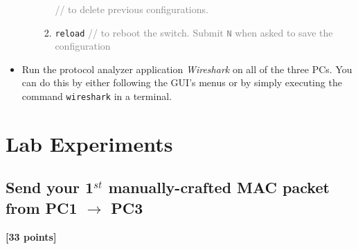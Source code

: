 \documentclass[pdftex,12pt,a4paper]{article}
\begin{document}
\begin{itemize}
\begin{enumerate}
\begin{enumerate}
                            \textcolor{gray}{// to delete previous
                            configurations.}
                            \item \texttt{reload} \textcolor{gray}{// to reboot
                            the switch. Submit \texttt{N} when asked to save
                            the configuration}
                        \end{enumerate}
                \end{enumerate}
            \item Run the protocol analyzer application \emph{Wireshark} on all
            of the three PCs. You can do this by either following the GUI's
            menus or by simply executing the command \texttt{wireshark} in a
            terminal.
        \end{itemize}

    \section{Lab Experiments}
        \subsection{Send your 1$^{st}$ manually-crafted MAC packet from PC1
        $\longrightarrow$ PC3}\label{sec:1to3}
            \begin{flushright}
                \textbf{[33 points]}
            \end{flushright}
\end{document}
